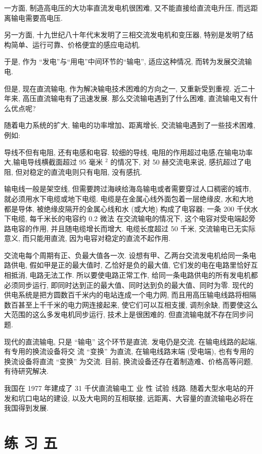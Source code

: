 \documentclass[10pt]{article}
\begin{document}
一方面, 制造高电压的大功率直流发电机很困难, 又不能直接给直流电升压, 而远距离输电需要高电压.

另一方面, 十九世纪八十年代末发明了三相交流发电机和变压器, 特别是发明了结构简单、运行可靠、价格便宜的感应电动机.

于是, 作为 “发电”与“用电”中间环节的“输电”, 适应这种情况, 而转为发展交流输电.

但是, 现在直流输电, 作为解决输电技术困难的方向之一, 又重新受到重视. 近二十年来, 高压直流输电有了迅速发展. 那么交流输电遇到了什么困难, 直流输电又有什么优点呢?

随着电力系统的扩大, 输电的功率增加、距离增长, 交流输电遇到了一些技术困难, 例如:

导线不但有电阻, 还有电感和电容. 较细的导线, 电阻的作用超过电感,在输电功率大,输电导线横截面超过 95 毫米 \({}^{2}\) 的情况下, 对 50 赫交流电来说, 感抗超过了电阻, 但对稳定的直流电则只有电阻, 没有感抗.

输电线一般是架空线, 但需要跨过海峡给海岛输电或者需要穿过人口稠密的城市, 就必须用水下电缆或地下电缆. 电缆是在金属心线外面包着一层绝缘皮, 水和大地都是导体, 被绝缘皮隔开的金属心线和水 (或大地) 构成了电容器; 一条 200 千伏水下电缆, 每千米长的电容约 0.2 微法 在交流输电的情况下, 这个电容对受电端起旁路电容的作用, 并且随电缆增长而增大. 电缆长度超过 50 千米, 交流输电已无实际意义, 而只能用直流, 因为电容对稳定的直流不起作用.

交流电每个周期有正、负最大值各一次. 设想有甲、乙两台交流发电机给同一条电路供电, 假如甲是正的最大值时, 乙恰好是负的最大值, 它们发的电在电路里恰好互相抵消, 电路无法工作. 所以要使电路正常工作, 给同一条电路供电的所有发电机都必须同步运行, 即同时达到正的最大值、同时达到负的最大值、同时为零. 现代的供电系统是把方圆数百千米内的电站连成一个电力网, 而且用高压输电线路将相隔数百甚至上千千米的电力网连接起来, 使它们可以互相支援, 调剂余缺, 而要使这么大范围的这么多发电机同步运行, 技术上是很困难的. 但直流输电就不存在同步问题.

现代的直流输电, 只是 “输电” 这个环节是直流. 发电仍是交流. 在输电线路的起端, 有专用的换流设备将交 流 “变换” 为直流, 在输电线路末端 (受电端), 也有专用的换流设备将直流 “变换” 为交流. 目前, 换流设备还存在着制造难、价格高等问题, 有待研究解决.

我国在 1977 年建成了 31 千伏直流输电工 业 性 试验 线路. 随着大型水电站的开发和坑口电站的建设, 以及大电网的互相联接, 远距离、大容量的直流输电必将在我国得到发展.

\section*{练 习 五}
\end{document}
